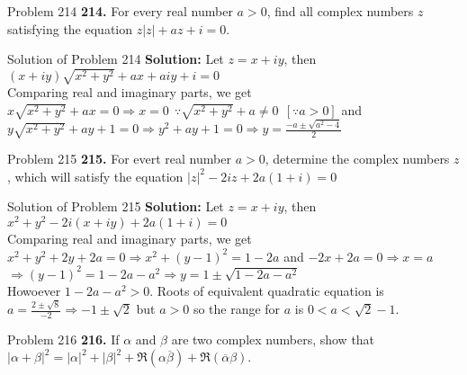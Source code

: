 \documentclass[aspectratio=169,8pt]{beamer}
\begin{document}
\begin{frame}{Problem 214}
  \textbf{214.} For every real number $a > 0$, find all complex numbers $z$ satisfying the equation $z|z| + az + i = 0$.
\end{frame}
\begin{frame}{Solution of Problem 214}
  \textbf{Solution:} Let $z = x + iy$, then $(x + iy)\sqrt{x^2 + y^2} + ax + aiy + i = 0$
  \\\vspace*{0.2cm}
  Comparing real and imaginary parts, we get
  \\\vspace*{0.2cm}
  $x\sqrt{x^2 + y^2} + ax = 0\Rightarrow x = 0~~\because \sqrt{x^2 + y^2} + a\neq 0 ~~[\because a > 0]$ and
  \\\vspace*{0.2cm}
  $y\sqrt{x^2 + y^2} + ay + 1 = 0\Rightarrow y^2 + ay + 1 = 0 \Rightarrow y = \frac{-a \pm \sqrt{a^2 - 4}}{2}$
\end{frame}
\begin{frame}{Problem 215}
  \textbf{215.} For evert real number $a > 0$, determine the complex numbers $z$, which will satisfy the equation $|z|^2 - 2iz +
  2a(1 + i) = 0$
\end{frame}
\begin{frame}{Solution of Problem 215}
  \textbf{Solution:} Let $z = x + iy$, then $x^2 + y^2 - 2i(x + iy) + 2a(1 + i) = 0$
  \\\vspace*{0.2cm}
  Comparing real and imaginary parts, we get
  \\\vspace*{0.2cm}
  $x^2 + y^2 + 2y + 2a = 0 \Rightarrow x^2 + (y - 1)^2 = 1 - 2a$ and $-2x + 2a = 0 \Rightarrow x = a$
  \\\vspace*{0.2cm}
  $\Rightarrow (y - 1)^2 = 1 - 2a - a^2 \Rightarrow y = 1 \pm \sqrt{1 - 2a - a^2}$
  \\\vspace*{0.2cm}
  Howoever $1 - 2a - a^2 > 0$. Roots of equivalent quadratic equation is $a = \frac{2 \pm \sqrt{8}}{-2} \Rightarrow -1\pm \sqrt{2}$
  but $a > 0$ so the range for $a$ is $0 < a < \sqrt{2} - 1$.
\end{frame}
\begin{frame}{Problem 216}
  \textbf{216.} If $\alpha$ and $\beta$ are two complex numbers, show that $|\alpha + \beta|^2 = |\alpha|^2 + |\beta|^2 +
  \Re(\alpha\overline{\beta}) + \Re(\overline{\alpha}\beta)$.
\end{frame}
\end{document}
